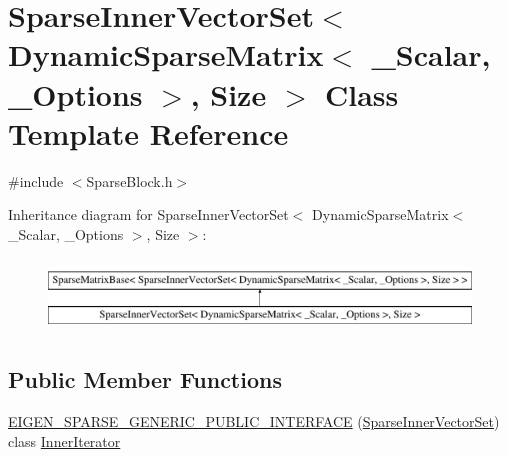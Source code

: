 \hypertarget{class_sparse_inner_vector_set_3_01_dynamic_sparse_matrix_3_01___scalar_00_01___options_01_4_00_01_size_01_4}{\section{Sparse\-Inner\-Vector\-Set$<$ Dynamic\-Sparse\-Matrix$<$ \-\_\-\-Scalar, \-\_\-\-Options $>$, Size $>$ Class Template Reference}
\label{class_sparse_inner_vector_set_3_01_dynamic_sparse_matrix_3_01___scalar_00_01___options_01_4_00_01_size_01_4}
}


{\ttfamily \#include $<$Sparse\-Block.\-h$>$}

Inheritance diagram for Sparse\-Inner\-Vector\-Set$<$ Dynamic\-Sparse\-Matrix$<$ \-\_\-\-Scalar, \-\_\-\-Options $>$, Size $>$\-:\begin{figure}[H]
\begin{center}
\leavevmode
\includegraphics[height=1.931034cm]{class_sparse_inner_vector_set_3_01_dynamic_sparse_matrix_3_01___scalar_00_01___options_01_4_00_01_size_01_4}
\end{center}
\end{figure}
\subsection*{Public Member Functions}
\begin{DoxyCompactItemize}
\item 
\hyperlink{class_sparse_inner_vector_set_3_01_dynamic_sparse_matrix_3_01___scalar_00_01___options_01_4_00_01_size_01_4_aa24dddef5254ea1f09b5c43a3556c810}{E\-I\-G\-E\-N\-\_\-\-S\-P\-A\-R\-S\-E\-\_\-\-G\-E\-N\-E\-R\-I\-C\-\_\-\-P\-U\-B\-L\-I\-C\-\_\-\-I\-N\-T\-E\-R\-F\-A\-C\-E} (\hyperlink{class_sparse_inner_vector_set}{Sparse\-Inner\-Vector\-Set}) class \hyperlink{class_inner_iterator}{Inner\-Iterator}
\end{DoxyCompactItemize}

